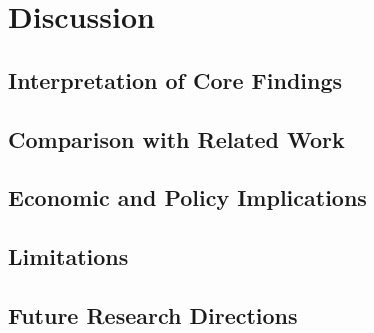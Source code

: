 
\section{Discussion} \label{sec: discussion}
\subsection{Interpretation of Core Findings}
\subsection{Comparison with Related Work}
\subsection{Economic and Policy Implications}
\subsection{Limitations}
\subsection{Future Research Directions}